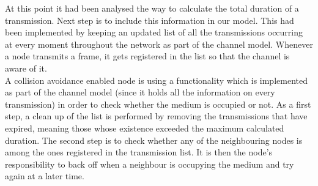 
At this point it had been analysed the way to calculate the total duration of a transmission. Next step is to include this information in our model. This had been implemented by keeping an updated list of all the transmissions occurring at every moment throughout the network as part of the channel model. Whenever a node transmits a frame, it gets registered in the list so that the channel is aware of it.\\
A collision avoidance enabled node is using a functionality which is implemented as part of the channel model (since it holds all the information on every transmission) in order to check whether the medium is occupied or not. As a first step, a clean up of the list is performed by removing the transmissions that have expired, meaning those whose existence exceeded the maximum calculated duration. The second step is to check whether any of the neighbouring nodes is among the ones registered in the transmission list. It is then the node's responsibility to back off when a neighbour is occupying the medium and try again at a later time.

